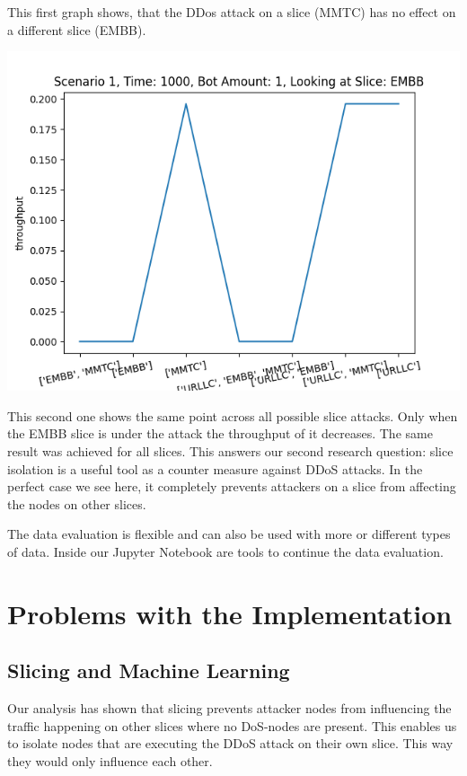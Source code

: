     This first graph shows, that the DDos attack on a slice (MMTC) has no effect on a different slice (EMBB).
    
    \includegraphics[width=\textwidth]{img/slice_isolation_works_dossed_slices.png}
    
    This second one shows the same point across all possible slice attacks. Only when the EMBB slice is under the attack the throughput of it decreases. The same result was achieved for all slices. This answers our second research question: slice isolation is a useful tool as a counter measure against DDoS attacks. In the perfect case we see here, it completely prevents attackers on a slice from affecting the nodes on other slices.
    
    The data evaluation is flexible and can also be used with more or different types of data. Inside our Jupyter Notebook are tools to continue the data evaluation.
    
\section{Problems with the Implementation}
    \subsection{Slicing and Machine Learning}
    Our analysis has shown that slicing prevents attacker nodes from influencing the traffic happening on other slices where no DoS-nodes are present. This enables us to isolate nodes that are executing the DDoS attack on their own slice. This way they would only influence each other.
    
